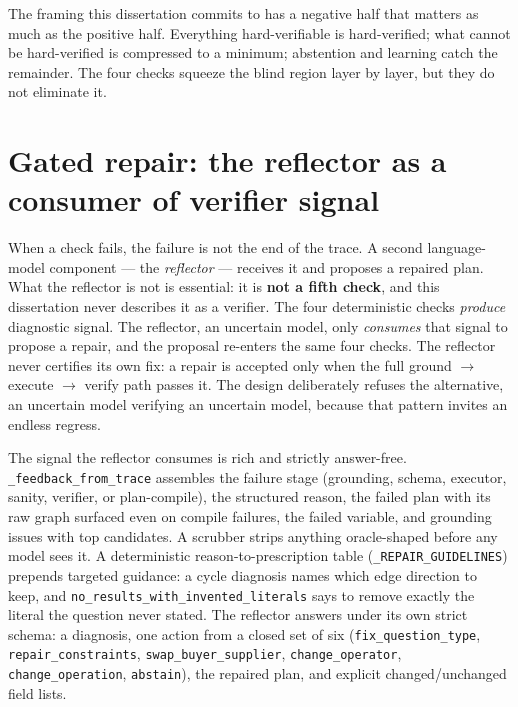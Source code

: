 The framing this dissertation commits to has a negative half that matters as much as the positive half. Everything hard-verifiable is hard-verified; what cannot be hard-verified is compressed to a minimum; abstention and learning catch the remainder. The four checks squeeze the blind region layer by layer, but they do not eliminate it.

\section{Gated repair: the reflector as a consumer of verifier signal}\label{sec:gated-repair-the-reflector-as-a-consumer}

When a check fails, the failure is not the end of the trace. A second language-model component --- the \emph{reflector} --- receives it and proposes a repaired plan. What the reflector is not is essential: it is \textbf{not a fifth check}, and this dissertation never describes it as a verifier. The four deterministic checks \emph{produce} diagnostic signal. The reflector, an uncertain model, only \emph{consumes} that signal to propose a repair, and the proposal re-enters the same four checks. The reflector never certifies its own fix: a repair is accepted only when the full ground $\rightarrow$ execute $\rightarrow$ verify path passes it. The design deliberately refuses the alternative, an uncertain model verifying an uncertain model, because that pattern invites an endless regress.

The signal the reflector consumes is rich and strictly answer-free. \texttt{\_feedback\_from\_trace} assembles the failure stage (grounding, schema, executor, sanity, verifier, or plan-compile), the structured reason, the failed plan with its raw graph surfaced even on compile failures, the failed variable, and grounding issues with top candidates. A scrubber strips anything oracle-shaped before any model sees it. A deterministic reason-to-prescription table (\texttt{\_REPAIR\_GUIDELINES}) prepends targeted guidance: a cycle diagnosis names which edge direction to keep, and \texttt{no\_results\_with\_invented\_literals} says to remove exactly the literal the question never stated. The reflector answers under its own strict schema: a diagnosis, one action from a closed set of six (\texttt{fix\_question\_type}, \texttt{repair\_constraints}, \texttt{swap\_buyer\_supplier}, \texttt{change\_operator}, \texttt{change\_operation}, \texttt{abstain}), the repaired plan, and explicit changed/unchanged field lists.

